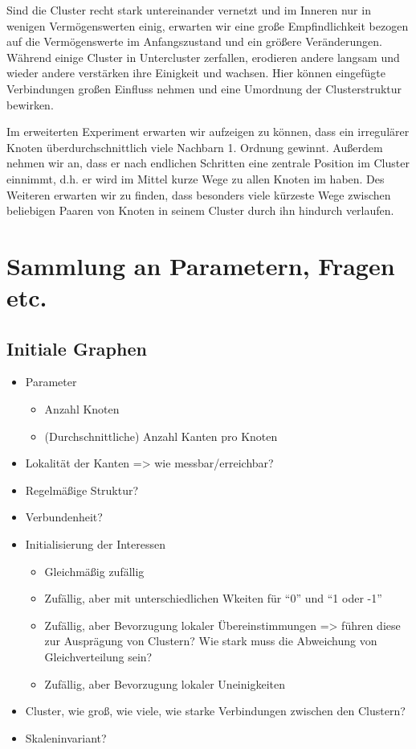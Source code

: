 \documentclass[11pt, a4paper]{scrartcl}
\begin{document}
Sind die Cluster recht stark untereinander vernetzt und im Inneren nur in wenigen Vermögenswerten einig, erwarten wir eine große Empfindlichkeit bezogen auf die Vermögenswerte im Anfangszustand und ein größere Veränderungen. Während einige Cluster in Untercluster zerfallen, erodieren andere langsam und wieder andere verstärken ihre Einigkeit und wachsen. Hier können eingefügte Verbindungen großen Einfluss nehmen und eine Umordnung der Clusterstruktur bewirken.

Im erweiterten Experiment erwarten wir aufzeigen zu können, dass ein irregulärer Knoten überdurchschnittlich viele Nachbarn 1. Ordnung gewinnt. Außerdem nehmen wir an, dass er nach endlichen Schritten eine zentrale Position im Cluster einnimmt, d.h. er wird im Mittel kurze Wege zu allen Knoten im  haben. Des Weiteren erwarten wir zu finden, dass besonders viele kürzeste Wege zwischen beliebigen Paaren von Knoten in seinem Cluster durch ihn hindurch verlaufen. 

\printbibliography

\appendix
\section{Sammlung an Parametern, Fragen etc.}
\subsection{Initiale Graphen}
\begin{itemize}
\item Parameter\begin{itemize}
	\item Anzahl Knoten
	\item (Durchschnittliche) Anzahl Kanten pro Knoten
\end{itemize}
\item Lokalität der Kanten => wie messbar/erreichbar?
\item Regelmäßige Struktur?
\item Verbundenheit?
\item Initialisierung der Interessen\begin{itemize}
	\item Gleichmäßig zufällig
	\item Zufällig, aber mit unterschiedlichen Wkeiten für "`0"' und "`1 oder -1"'
	\item Zufällig, aber Bevorzugung lokaler Übereinstimmungen => führen diese zur Ausprägung von Clustern? Wie stark muss die Abweichung von Gleichverteilung sein?
	\item Zufällig, aber Bevorzugung lokaler Uneinigkeiten
\end{itemize}
\item Cluster, wie groß, wie viele, wie starke Verbindungen zwischen den Clustern?
\item Skaleninvariant?
\end{itemize}
\end{document}
